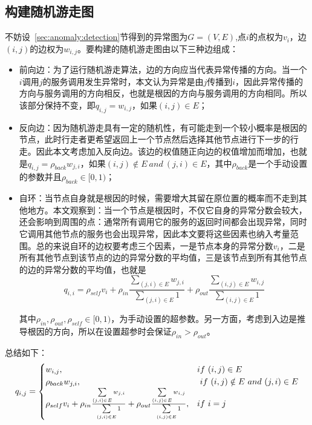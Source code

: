 \subsection{构建随机游走图}
不妨设~\ref{sec:anomaly:detection}节得到的异常图为$G=(V,E)$,点$i$的点权为$v_i$，边$(i,j)$的边权为$w_{i,j}$。要构建的随机游走图由以下三种边组成：
\begin{itemize}
  \item 前向边：为了运行随机游走算法，边的方向应当代表异常传播的方向。当一个$i$调用$j$的服务调用发生异常时，本文认为异常是由$j$传播到$i$，因此异常传播的方向与服务调用的方向相反，也就是根因的方向与服务调用的方向相同。所以该部分保持不变，即$q_{i,j} = w_{i,j}$，如果$(i,j) \in E$；
  \item 反向边：因为随机游走具有一定的随机性，有可能走到一个较小概率是根因的节点，此时行走者更希望返回上一个节点然后选择其他节点进行下一步的行走。因此本文考虑加入反向边。该边的权值随正向边的权值增加而增加，也就是$q_{i,j} = \rho_{back} w_{j,i}$，如果$(i,j) \notin E\ and\  (j,i) \in E$，其中$\rho_{back}$是一个手动设置的参数并且$\rho_{back} \in [0,1)$；
  \item 自环：当节点自身就是根因的时候，需要增大其留在原位置的概率而不走到其他地方。本文观察到：当一个节点是根因时，不仅它自身的异常分数会较大，还会影响到周围的点：通常所有调用它的服务的返回时间都会出现异常，同时它调用其他节点的服务也会出现异常，因此本文要将这些因素也纳入考量范围。总的来说自环的边权要考虑三个因素，一是节点本身的异常分数$v_i$，二是所有其他节点到该节点的边的异常分数的平均值，三是该节点到所有其他节点的边的异常分数的平均值，也就是
  \begin{equation*}
    q_{i,i} = \rho_{self} v_i + \rho_{in} \frac{\sum\limits_{(j,i) \in E}{w_{j,i}}}{\sum\limits_{(j,i) \in E}1} + \rho_{out} \frac{\sum\limits_{(i,j) \in E}{w_{i,j}}}{\sum\limits_{(i,j) \in E}1}
  \end{equation*}

  其中$\rho_{in},\rho_{out},\rho_{self}\in [0,1)$，为手动设置的超参数。另一方面，考虑到入边是推导根因的方向，所以在设置超参时会保证$\rho_{in}>\rho_{out}$。
\end{itemize}

总结如下：
\begin{equation*}
q_{i,j} = \begin{cases} w_{i,j}, & if\ (i,j) \in E \cr \rho_{back} w_{j,i}, &\ if\ (i,j) \notin E\ and\  (j,i) \in E \cr \rho_{self} v_i + \rho_{in} \frac{\sum\limits_{(j,i) \in E}{w_{j,i}}}{\sum\limits_{(j,i) \in E}1} + \rho_{out} \frac{\sum\limits_{(i,j) \in E}{w_{i,j}}}{\sum\limits_{(i,j) \in E}1}, & if\ i=j \end{cases}
\end{equation*}

